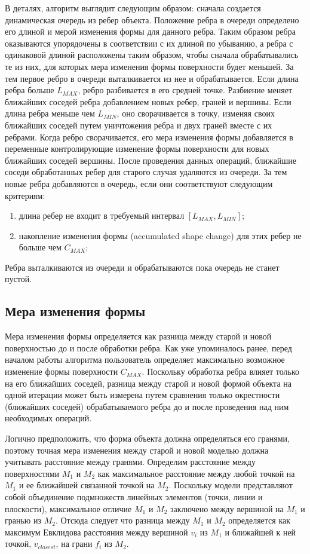 \documentclass[14pt]{article}
\numberwithin{figure}{section}
\numberwithin{equation}{section}
\begin{document}
В деталях, алгоритм выглядит следующим образом: сначала создается динамическая очередь из ребер объекта. Положение ребра в очереди определено его длиной и мерой изменения формы для данного ребра. Таким образом ребра оказываются упорядочены в соответствии с их длиной по убыванию, а ребра с одинаковой длиной расположены таким образом, чтобы сначала обрабатывались те из них, для которых мера изменения формы поверхности будет меньшей. За тем первое ребро в очереди выталкивается из нее и обрабатывается. Если длина ребра больше $L_{MAX}$, ребро разбивается в его средней точке. Разбиение меняет ближайших соседей ребра добавлением новых ребер, граней и вершины. Если длина ребра меньше чем $L_{MIN}$, оно сворачивается в точку, изменяя своих ближайших соседей путем уничтожения ребра и двух граней вместе с их ребрами. Когда ребро сворачивается, его мера изменения формы добавляется в переменные контролирующие изменение формы поверхности для новых ближайших соседей вершины. После проведения данных операций, ближайшие соседи обработанных ребер для старого случая удаляются из очереди. За тем новые ребра добавляются в очередь, если они соответствуют следующим критериям:

\begin{enumerate}
	\item
	длина ребер не входит в требуемый интервал $[L_{MAX}, L_{MIN}]$;
	\item
	накопление изменения формы (accumulated shape change) для этих ребер не больше чем $C_{MAX}$;
\end{enumerate}

Ребра выталкиваются из очереди и обрабатываются пока очередь не станет пустой.

\subsection{Мера изменения формы}

Мера изменения формы определяется как разница между старой и новой поверхностью до и после обработки ребра. Как уже упоминалось ранее, перед началом работы алгоритма пользователь определяет максимально возможное изменение формы поверхности $C_{MAX}$. Поскольку обработка ребра влияет только на его ближайших соседей, разница между старой и новой формой объекта на одной итерации может быть измерена путем сравнения только окрестности (ближайших соседей) обрабатываемого ребра до и после проведения над ним необходимых операций.

Логично предположить, что форма объекта должна определяться его гранями, поэтому точная мера изменения между старой и новой моделью должна учитывать расстояние между гранями. Определим расстояние между поверхностями $M_1$ и $M_2$ как максимальное расстояние между любой точкой на $M_1$ и ее ближайшей связанной точкой на $M_2$. Поскольку модели представляют собой объединение подмножеств линейных элементов (точки, линии и плоскости), максимальное отличие $M_1$ и $M_2$ заключено между вершиной на $M_1$ и гранью из $M_2$. Отсюда следует что разница между $M_1$ и $M_2$ определяется как максимум Евклидова расстояния между вершиной $v_i$ из $M_1$ и ближайшей к ней точкой, $v_{closest}$, на грани $f_i$ из $M_2$.
\end{document}
